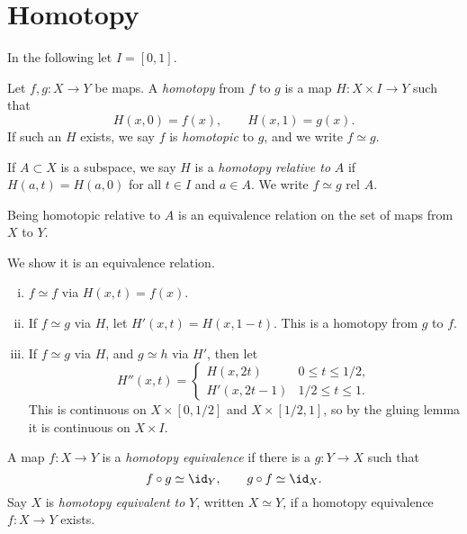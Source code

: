 \documentclass[12pt]{article}
\begin{document}
\newpage

\section{Homotopy}
\label{sec:homotopy}

In the following let $I = [0, 1]$.

\begin{definition}
	Let $f, g : X \to Y$ be maps. A \emph{homotopy} from $f$ to $g$ is a map $H : X \times I \to Y$ such that
	\[
	H(x, 0) = f(x), \qquad H(x, 1) = g(x).
	\]
	If such an $H$ exists, we say $f$ is \emph{homotopic} to $g$, and we write $f \simeq g$.

	If $A \subset X$ is a subspace, we say $H$ is a \emph{homotopy relative to} $A$ if $H(a, t) = H(a, 0)$ for all $t \in I$ and $a \in A$. We write $f \simeq g$ rel $A$.
\end{definition}

\begin{proposition}
	Being homotopic relative to $A$ is an equivalence relation on the set of maps from $X$ to $Y$.
\end{proposition}

\begin{proofbox}
	We show it is an equivalence relation.
	\begin{enumerate}[(i)]
		\item $f \simeq f$ via $H(x, t) = f(x)$.
		\item If $f \simeq g$ via $H$, let $H'(x, t) = H(x, 1-t)$. This is a homotopy from $g$ to $f$.
		\item If $f \simeq g$ via $H$, and $g \simeq h$ via $H'$, then let
			\[
			H''(x, t) =
			\begin{cases}
				H(x, 2t) & 0 \leq t \leq 1/2,\\
				H'(x, 2t - 1) & 1/2 \leq t \leq 1.
			\end{cases}
			\]
			This is continuous on $X \times [0, 1/2]$ and $X \times [1/2, 1]$, so by the gluing lemma it is continuous on $X \times I$.
	\end{enumerate}
\end{proofbox}

\begin{definition}
	A map $f : X \to Y$ is a \emph{homotopy equivalence} if there is a $g : Y \to X$ such that
	\[
	f \circ g \simeq \id_Y, \qquad g \circ f \simeq \id_X.
	\]
	Say $X$ is \emph{homotopy equivalent to} $Y$, written $X \simeq Y$, if a homotopy equivalence $f : X \to Y$ exists.
\end{definition}
\end{document}
